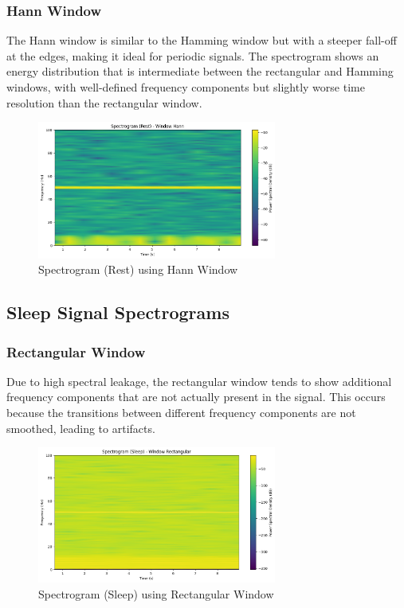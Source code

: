 \documentclass[10pt]{article}
\theoremstyle{definition}
\theoremstyle{remark}
\theoremstyle{definition}
\numberwithin{equation}{prob}
\begin{document}
\subsubsection{Hann Window}
The Hann window is similar to the Hamming window but with a steeper fall-off at the edges, making it ideal for periodic signals. The spectrogram shows an energy distribution that is intermediate between the rectangular and Hamming windows, with well-defined frequency components but slightly worse time resolution than the rectangular window.

\begin{figure}[H]
    \centering
    \includegraphics[width=0.7\textwidth]{./figures/Spectrogram Rest Window Hann.png}
    \caption{Spectrogram (Rest) using Hann Window}
\end{figure}


\subsection{Sleep Signal Spectrograms}

\subsubsection{Rectangular Window}
Due to high spectral leakage, the rectangular window tends to show additional frequency components that are not actually present in the signal. This occurs because the transitions between different frequency components are not smoothed, leading to artifacts.

\begin{figure}[H]
    \centering
    \includegraphics[width=0.7\textwidth]{./figures/Spectrogram Sleep Window Rectangular.png}
    \caption{Spectrogram (Sleep) using Rectangular Window}
\end{figure}
\end{document}
